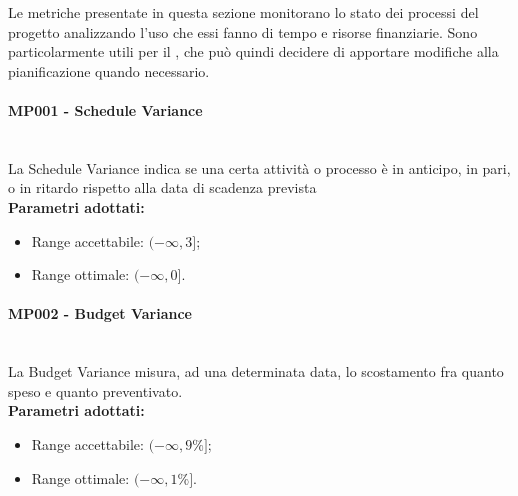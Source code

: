 Le metriche presentate in questa sezione monitorano lo stato dei processi del progetto analizzando l'uso che essi fanno di tempo e risorse finanziarie. Sono particolarmente utili per il \Res , che può quindi decidere di apportare modifiche alla pianificazione quando necessario.

\paragraph{MP001 - Schedule Variance}\mbox{}\\[0,3cm]
La Schedule Variance indica se una certa attività o processo è in anticipo, in pari, o in ritardo rispetto alla data di scadenza prevista\\[0,2cm]
\textbf{Parametri adottati:}
\begin{itemize}
	\item Range accettabile: $(-\infty , 3]$;
	\item Range ottimale: $(-\infty , 0]$.
\end{itemize}

\paragraph{MP002 - Budget Variance}\mbox{}\\[0,3cm]
La Budget Variance misura, ad una determinata data, lo scostamento fra quanto speso e quanto preventivato. \\[0,2cm]
\textbf{Parametri adottati:}
\begin{itemize}
	\item Range accettabile: $(-\infty , 9\%]$;
	\item Range ottimale: $(-\infty , 1\%]$.
\end{itemize}